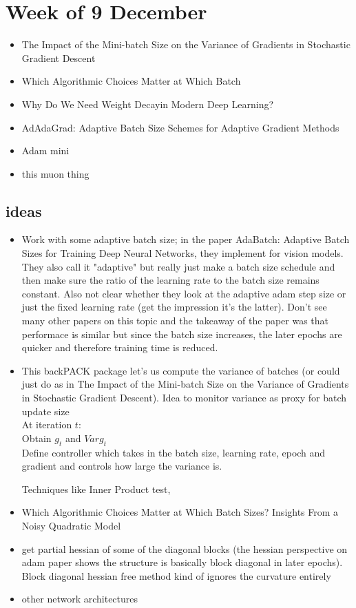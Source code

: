 \documentclass[12pt]{book}
\begin{document}
\section*{Week of 9 December}
\begin{itemize}
\item The Impact of the Mini-batch Size on the Variance of Gradients in Stochastic Gradient Descent
\item Which Algorithmic Choices Matter at Which Batch
\item Why Do We Need Weight Decayin Modern Deep Learning?
\item AdAdaGrad: Adaptive Batch Size Schemes for Adaptive Gradient Methods
\item Adam mini
\item this muon thing
\end{itemize}



\subsection*{ideas}
\begin{itemize}
\item Work with some adaptive batch size; in the paper AdaBatch: Adaptive Batch Sizes for Training Deep Neural Networks, they implement for vision models. They also call it "adaptive" but really just make a batch size schedule and then make sure the ratio of the learning rate to the batch size remains constant. Also not clear whether they look at the adaptive adam step size or just the fixed learning rate (get the impression it's the latter). Don't see many other papers on this topic and the takeaway of the paper was that performace is similar but since the batch size increases, the later epochs are quicker and therefore training time is reduced.
\item This backPACK package let's us compute the variance of batches (or could just do as in The Impact of the Mini-batch Size on the
Variance of Gradients in Stochastic Gradient Descent). Idea to monitor variance as proxy for batch update size\\
At iteration $t$:\\
Obtain $g_t$ and  $Var g_t$\\
Define controller which takes in the batch size, learning rate, epoch and gradient and controls how large the variance is.

Techniques like Inner Product test, 
\item Which Algorithmic Choices Matter at Which Batch
Sizes? Insights From a Noisy Quadratic Model
\item get partial hessian of some of the diagonal blocks  (the hessian perspective on adam paper shows the structure is basically block diagonal in later epochs). Block diagonal hessian free method kind of ignores the curvature entirely 
\item other network architectures 
\end{itemize}
\end{document}
